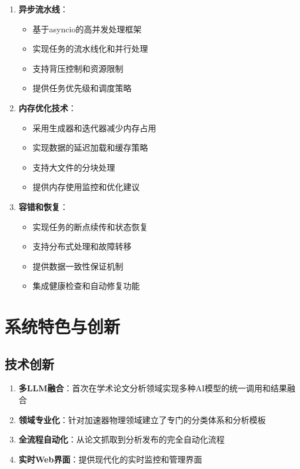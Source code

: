 \documentclass[12pt,a4paper]{article}
\begin{document}
\begin{enumerate}
    \item \textbf{异步流水线}：
        \begin{itemize}
            \item 基于asyncio的高并发处理框架
            \item 实现任务的流水线化和并行处理
            \item 支持背压控制和资源限制
            \item 提供任务优先级和调度策略
        \end{itemize}
    
    \item \textbf{内存优化技术}：
        \begin{itemize}
            \item 采用生成器和迭代器减少内存占用
            \item 实现数据的延迟加载和缓存策略
            \item 支持大文件的分块处理
            \item 提供内存使用监控和优化建议
        \end{itemize}
    
    \item \textbf{容错和恢复}：
        \begin{itemize}
            \item 实现任务的断点续传和状态恢复
            \item 支持分布式处理和故障转移
            \item 提供数据一致性保证机制
            \item 集成健康检查和自动修复功能
        \end{itemize}
\end{enumerate}

\section{系统特色与创新}

\subsection{技术创新}
\begin{enumerate}
    \item \textbf{多LLM融合}：首次在学术论文分析领域实现多种AI模型的统一调用和结果融合
    \item \textbf{领域专业化}：针对加速器物理领域建立了专门的分类体系和分析模板
    \item \textbf{全流程自动化}：从论文抓取到分析发布的完全自动化流程
    \item \textbf{实时Web界面}：提供现代化的实时监控和管理界面
\end{enumerate}
\end{document}
